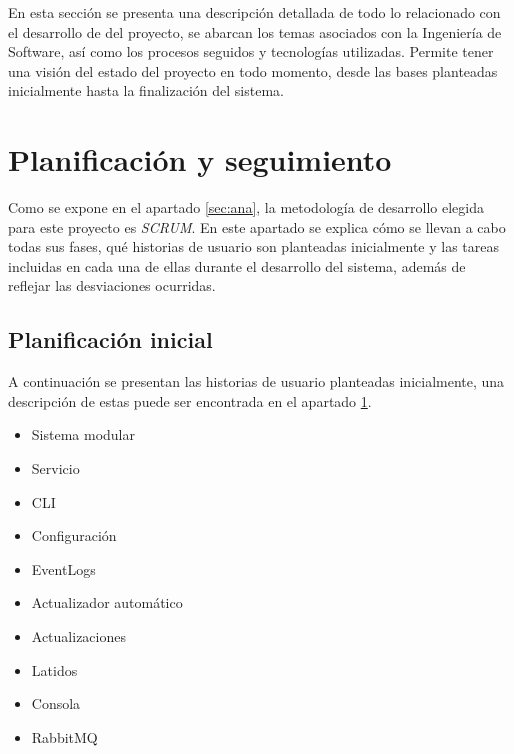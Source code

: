 En esta sección se presenta una descripción detallada de todo lo relacionado con el desarrollo de del proyecto, se abarcan los temas asociados con la Ingeniería de Software, así como los procesos seguidos y tecnologías utilizadas. Permite tener una visión del estado del proyecto en todo momento, desde las bases planteadas inicialmente hasta la finalización del sistema.

\section{Planificación y seguimiento} \label{sec:plan}
    
    Como se expone en el apartado \ref{sec:ana}, la metodología de desarrollo elegida para este proyecto es \textit{SCRUM}.  En este apartado se explica cómo se llevan a cabo todas sus fases, qué historias de usuario son planteadas inicialmente y las tareas incluidas en cada una de ellas durante el desarrollo del sistema, además de reflejar las desviaciones ocurridas.
    
    \subsection{Planificación inicial}
        
        A continuación se presentan las historias de usuario planteadas inicialmente, una descripción de estas puede ser encontrada en el apartado \ref{sec:plan}.
        
        \begin{itemize}
        \setlength\itemsep{1.5em}
            \item Sistema modular
            \item Servicio
            \item CLI
            \item Configuración
            \item EventLogs
            \item Actualizador automático
            \item Actualizaciones
            \item Latidos
            \item Consola
            \item RabbitMQ
        \end{itemize}
    

